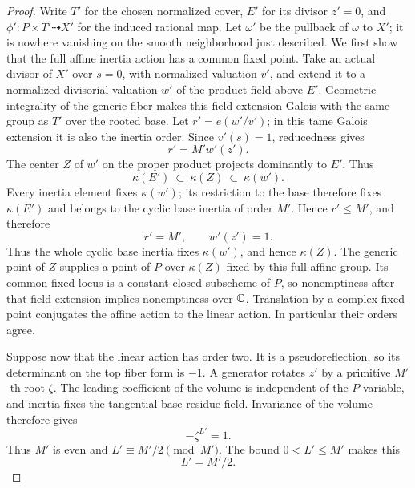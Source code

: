 \begin{proof}
Write \(T'\) for the chosen normalized cover, \(E'\) for its divisor
\(z'=0\), and \(\phi':P\times T'\dashrightarrow X'\) for the induced
rational map.  Let \(\omega'\) be the pullback of \(\omega\) to \(X'\);
it is nowhere vanishing on the smooth neighborhood just described.
We first show that the full affine inertia action has a common fixed
point.  Take an actual divisor of \(X'\) over \(s=0\), with normalized
valuation \(v'\), and extend it to a normalized divisorial valuation
\(w'\) of the product field above \(E'\).
Geometric integrality of the generic fiber makes this field extension
Galois with the same group as \(T'\) over the rooted base.
Let \(r'=e(w'/v')\); in this tame Galois extension it is also the
inertia order.  Since \(v'(s)=1\), reducedness gives
\[
                     r'=M'w'(z').
\]
The center \(Z\) of \(w'\) on the proper product projects dominantly
to \(E'\).  Thus
\[
             \kappa(E')\ \subset\ \kappa(Z)\ \subset\ \kappa(w').
\]
Every inertia element fixes \(\kappa(w')\); its restriction to the
base therefore fixes \(\kappa(E')\) and belongs to the cyclic base
inertia of order \(M'\).
Hence \(r'\le M'\), and therefore
\[
                         r'=M',\qquad w'(z')=1.
\]
Thus the whole cyclic base inertia fixes \(\kappa(w')\), and hence
\(\kappa(Z)\).  The generic point of \(Z\) supplies a point of \(P\)
over \(\kappa(Z)\) fixed by this full affine group.  Its common fixed
locus is a constant closed subscheme of \(P\), so nonemptiness after
that field extension implies nonemptiness over \(\mathbb C\).
Translation by a complex fixed point conjugates the affine action to
the linear action.  In particular their orders agree.

Suppose now that the linear action has order two.
It is a pseudoreflection, so its determinant on the top fiber form
is \(-1\).  A generator rotates \(z'\) by a primitive \(M'\)-th
root \(\zeta\).
The leading coefficient of the volume is independent of the
\(P\)-variable, and inertia fixes the tangential base residue field.
Invariance of the volume therefore gives
\[
                          -\zeta^{L'}=1.
\]
Thus \(M'\) is even and \(L'\equiv M'/2\pmod {M'}\).
The bound \(0<L'\le M'\) makes this
\[
                              L'=M'/2.
\]


\end{proof}
